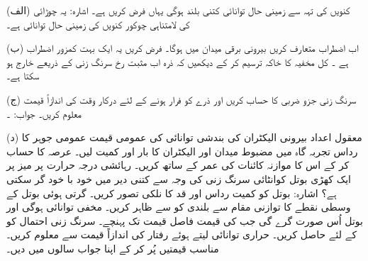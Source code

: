 (الف) کنویں کی تہہ سے زمینی حال توانائی کتنی بلند ہوگی یہاں فرض کریں  ہے۔ اشارہ: یہ  چوڑائی کی لامتناہی چوکور کنویں کی زمینی حال توانائی ہے۔

(ب) اب اضطراب  متعارف کریں بیرونی برقی میدان  میں  ہوگا۔ فرض کریں یہ ایک بہت کمزور اضطراب ہے ۔ کل مخفیہ کا خاکہ ترسیم کر کے دیکھیں کہ ذرہ اب مثبت  رخ سرنگ زنی کے ذریعے خارج ہو سکتا ہے۔

(ج) سرنگ زنی جزو ضربی   کا حساب کریں اور ذرے کو فرار ہونے کے لئے درکار وقت کی اندازاً قیمت  معلوم کریں۔ جواب: ۔

(د) معقول اعداد  بیرونی الیکٹران کی بندشی توانائی کی عمومی قیمت  عمومی جوہر کا رداس  تجربہ گاہ میں مضبوط میدان  اور  الیکٹران کا بار اور کمیت لیں۔ عرصہ  کا حساب کر کے اس کا موازنہ کائنات کی عمر کے ساتھ کریں۔
رہائشی درجہ حرارت پر میز پر ایک کھڑی بوتل کوانٹائی سرنگ زنی کی وجہ سے کتنی دیر میں خود با خود گر سکتی ہے؟ اشارہ: بوتل کو کمیت  رداس  اور قد  کا نلکی تصور کریں۔ گرتی ہوئی بوتل کے وسطی نقطے کا توازنی مقام  سے بلندی کو  سے ظاہر کریں۔ مخفی توانائی  ہوگی اور بوتل اُس صورت گرے گی جب  کی قیمت فاصل قیمت  تک پہنچے۔ سرنگ زنی احتمال  کو  کے لئے حاصل کریں۔ حراری توانائی  لیتے ہوئے رفتار کی اندازاً 	قیمت  سے معلوم کریں۔ مناسب قیمتیں پُر کر کے اپنا جواب سالوں میں دیں۔

